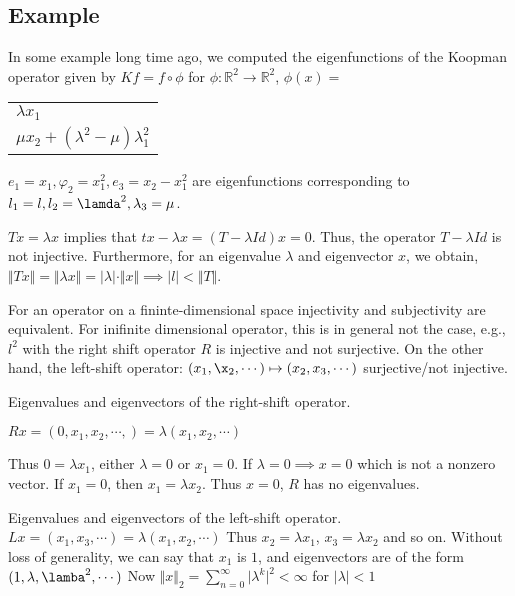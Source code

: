 \documentclass[11pt]{article}
\def\R{\mathbb{R}}
\begin{document}
\subsection{Example}
\label{sec:org3f6c34c}
In some example long time ago, we computed the eigenfunctions of the Koopman
operator given by \(Kf = f \circ \phi\) for \(\phi \colon \R^2 \rightarrow
   \R^2\), \(\phi(x)=\)

\begin{center}
\begin{tabular}{l}
\(\lambda x_1\)\\
\(\mu x_2 + (\lambda^2 - \mu)\lambda_1^2\)\\
\end{tabular}
\end{center}

\(e_1 = x_1, \varphi_2 = x_1^2, e_3 = x_2 - x_1^2\) are eigenfunctions
corresponding to \(l_1 = l, l_2 = \lamda^2, \lambda_3 = \mu\).

\(Tx = \lambda x\) implies that \(tx - \lambda x = (T - \lambda Id) x = 0\).
Thus, the operator \(T - \lambda Id\) is not injective. Furthermore, for an
eigenvalue \(\lambda\) and eigenvector \(x\), we obtain,\(\Vert T x \Vert = \Vert
   \lambda x \Vert = \vert \lambda \vert \cdot \Vert x \Vert \implies \vert l
   \vert < \Vert T \Vert\).

For an operator on a fininte-dimensional space injectivity and subjectivity
are equivalent. For inifinite dimensional operator, this is in general not
the case, e.g., \(l^2\) with the right shift operator \(R\) is injective and not
surjective. On the other hand, the left-shift operator: \((x_1, \x_2, \cdots)
   \mapsto (x_2, x_3, \cdots)\) surjective/not injective.

Eigenvalues and eigenvectors of the right-shift operator.

\(Rx = (0, x_1, x_2, \cdots,) = \lambda(x_1, x_2, \cdots)\)

Thus \(0 = \lambda x_1\), either \(\lambda = 0\) or \(x_1 = 0\). If \(\lambda = 0
   \implies x = 0\) which is not a nonzero vector. If \(x_1 = 0\), then \(x_1 =
   \lambda x_2\). Thus \(x = 0\), \(R\) has no eigenvalues.

Eigenvalues and eigenvectors of the left-shift operator. \(Lx = (x_1, x_3,
   \cdots) = \lambda(x_1, x_2, \cdots)\) Thus \(x_2 = \lambda x_1\), \(x_3 = \lambda
   x_2\) and so on. Without loss of generality, we can say that \(x_1\) is \(1\), and
eigenvectors are of the form \((1, \lambda, \lamba^2, \cdots)\) Now \(\Vert x
   \Vert_2 = \sum_{n = 0}^{\infty} \vert \lambda^k \vert^2 < \infty\) for \(\vert
   \lambda\vert < 1\)
\end{document}
